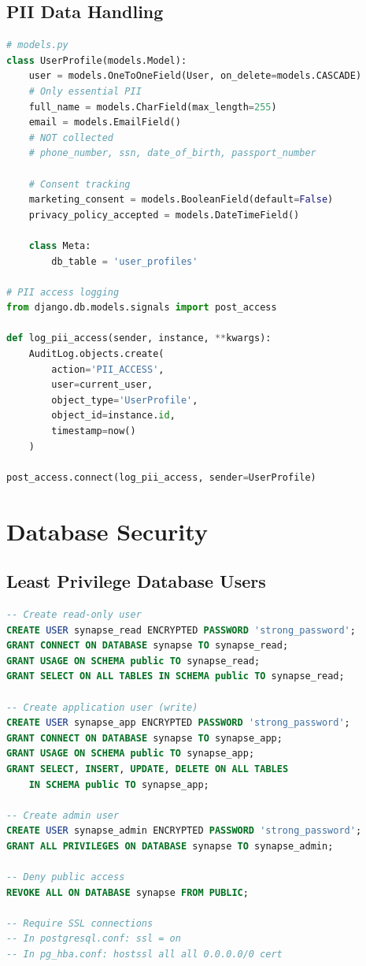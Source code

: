 \documentclass{report}
\begin{document}
\subsection{PII Data Handling}
\begin{lstlisting}[language=Python]
# models.py
class UserProfile(models.Model):
    user = models.OneToOneField(User, on_delete=models.CASCADE)
    # Only essential PII
    full_name = models.CharField(max_length=255)
    email = models.EmailField()
    # NOT collected
    # phone_number, ssn, date_of_birth, passport_number
    
    # Consent tracking
    marketing_consent = models.BooleanField(default=False)
    privacy_policy_accepted = models.DateTimeField()
    
    class Meta:
        db_table = 'user_profiles'

# PII access logging
from django.db.models.signals import post_access

def log_pii_access(sender, instance, **kwargs):
    AuditLog.objects.create(
        action='PII_ACCESS',
        user=current_user,
        object_type='UserProfile',
        object_id=instance.id,
        timestamp=now()
    )

post_access.connect(log_pii_access, sender=UserProfile)
\end{lstlisting}

\section{Database Security}

\subsection{Least Privilege Database Users}
\begin{lstlisting}[language=sql]
-- Create read-only user
CREATE USER synapse_read ENCRYPTED PASSWORD 'strong_password';
GRANT CONNECT ON DATABASE synapse TO synapse_read;
GRANT USAGE ON SCHEMA public TO synapse_read;
GRANT SELECT ON ALL TABLES IN SCHEMA public TO synapse_read;

-- Create application user (write)
CREATE USER synapse_app ENCRYPTED PASSWORD 'strong_password';
GRANT CONNECT ON DATABASE synapse TO synapse_app;
GRANT USAGE ON SCHEMA public TO synapse_app;
GRANT SELECT, INSERT, UPDATE, DELETE ON ALL TABLES 
    IN SCHEMA public TO synapse_app;

-- Create admin user
CREATE USER synapse_admin ENCRYPTED PASSWORD 'strong_password';
GRANT ALL PRIVILEGES ON DATABASE synapse TO synapse_admin;

-- Deny public access
REVOKE ALL ON DATABASE synapse FROM PUBLIC;

-- Require SSL connections
-- In postgresql.conf: ssl = on
-- In pg_hba.conf: hostssl all all 0.0.0.0/0 cert
\end{lstlisting}
\end{document}
